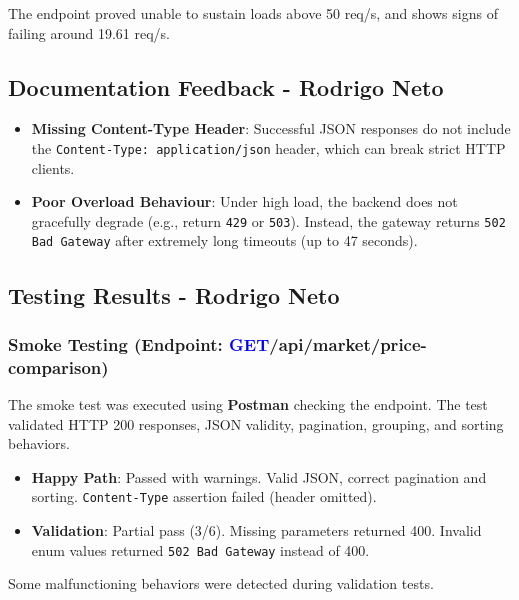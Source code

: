 \documentclass[11pt,a4paper]{article}
\newcommand{\getapi}{\textcolor{blue}{GET}}
\newcommand{\bff}[1]{\textbf{#1}}
\begin{document}
 The endpoint proved unable to sustain loads above 50 req/s, and shows signs of failing around 19.61 req/s.
 
 \subsection{Documentation Feedback - Rodrigo Neto}
 \begin{itemize}
  \item \bff{Missing Content-Type Header}: Successful JSON responses do not include the \texttt{Content-Type: application/json} header, which can break strict HTTP clients.
  \item \bff{Poor Overload Behaviour}: Under high load, the backend does not gracefully degrade (e.g., return \texttt{429} or \texttt{503}). Instead, the gateway returns \texttt{502 Bad Gateway} after extremely long timeouts (up to 47 seconds).
 \end{itemize}
 
 \subsection{Testing Results - Rodrigo Neto}
 
 \subsubsection{Smoke Testing (Endpoint: \getapi /api/market/price-comparison)}
 The smoke test was executed using \bff{Postman} checking the endpoint. The test validated HTTP 200 responses, JSON validity, pagination, grouping, and sorting behaviors.
 \begin{itemize}
  \item \bff{Happy Path}: Passed with warnings. Valid JSON, correct pagination and sorting. \texttt{Content-Type} assertion failed (header omitted).
  \item \bff{Validation}: Partial pass (3/6). Missing parameters returned 400. Invalid enum values returned \texttt{502 Bad Gateway} instead of 400.
 \end{itemize}
 Some malfunctioning behaviors were detected during validation tests.
 
\end{document}
